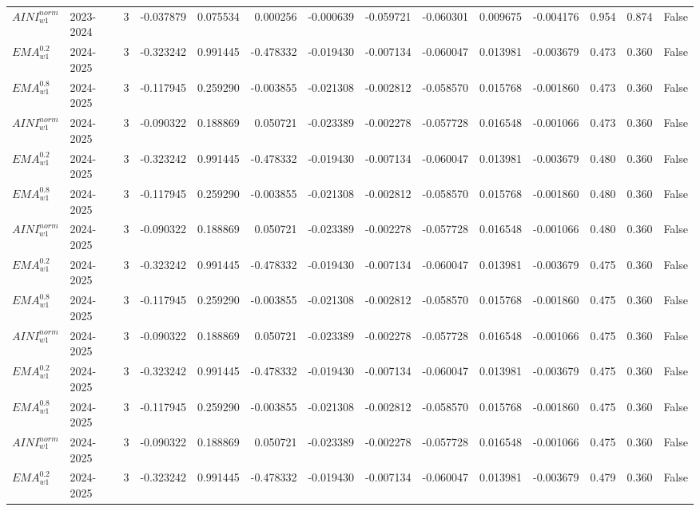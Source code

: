 \begin{tabular}{@{}llrrrrrrrrrlll@{}}
$AINI^{norm}_{w1}$ & 2023-2024 & 3 & -0.037879 & 0.075534 & 0.000256 & -0.000639 & -0.059721 & -0.060301 & 0.009675 & -0.004176 & 0.954 & 0.874 & False \\
$EMA^{0.2}_{w1}$ & 2024-2025 & 3 & -0.323242 & 0.991445 & -0.478332 & -0.019430 & -0.007134 & -0.060047 & 0.013981 & -0.003679 & 0.473 & 0.360 & False \\
$EMA^{0.8}_{w1}$ & 2024-2025 & 3 & -0.117945 & 0.259290 & -0.003855 & -0.021308 & -0.002812 & -0.058570 & 0.015768 & -0.001860 & 0.473 & 0.360 & False \\
$AINI^{norm}_{w1}$ & 2024-2025 & 3 & -0.090322 & 0.188869 & 0.050721 & -0.023389 & -0.002278 & -0.057728 & 0.016548 & -0.001066 & 0.473 & 0.360 & False \\
$EMA^{0.2}_{w1}$ & 2024-2025 & 3 & -0.323242 & 0.991445 & -0.478332 & -0.019430 & -0.007134 & -0.060047 & 0.013981 & -0.003679 & 0.480 & 0.360 & False \\
$EMA^{0.8}_{w1}$ & 2024-2025 & 3 & -0.117945 & 0.259290 & -0.003855 & -0.021308 & -0.002812 & -0.058570 & 0.015768 & -0.001860 & 0.480 & 0.360 & False \\
$AINI^{norm}_{w1}$ & 2024-2025 & 3 & -0.090322 & 0.188869 & 0.050721 & -0.023389 & -0.002278 & -0.057728 & 0.016548 & -0.001066 & 0.480 & 0.360 & False \\
$EMA^{0.2}_{w1}$ & 2024-2025 & 3 & -0.323242 & 0.991445 & -0.478332 & -0.019430 & -0.007134 & -0.060047 & 0.013981 & -0.003679 & 0.475 & 0.360 & False \\
$EMA^{0.8}_{w1}$ & 2024-2025 & 3 & -0.117945 & 0.259290 & -0.003855 & -0.021308 & -0.002812 & -0.058570 & 0.015768 & -0.001860 & 0.475 & 0.360 & False \\
$AINI^{norm}_{w1}$ & 2024-2025 & 3 & -0.090322 & 0.188869 & 0.050721 & -0.023389 & -0.002278 & -0.057728 & 0.016548 & -0.001066 & 0.475 & 0.360 & False \\
$EMA^{0.2}_{w1}$ & 2024-2025 & 3 & -0.323242 & 0.991445 & -0.478332 & -0.019430 & -0.007134 & -0.060047 & 0.013981 & -0.003679 & 0.475 & 0.360 & False \\
$EMA^{0.8}_{w1}$ & 2024-2025 & 3 & -0.117945 & 0.259290 & -0.003855 & -0.021308 & -0.002812 & -0.058570 & 0.015768 & -0.001860 & 0.475 & 0.360 & False \\
$AINI^{norm}_{w1}$ & 2024-2025 & 3 & -0.090322 & 0.188869 & 0.050721 & -0.023389 & -0.002278 & -0.057728 & 0.016548 & -0.001066 & 0.475 & 0.360 & False \\
$EMA^{0.2}_{w1}$ & 2024-2025 & 3 & -0.323242 & 0.991445 & -0.478332 & -0.019430 & -0.007134 & -0.060047 & 0.013981 & -0.003679 & 0.479 & 0.360 & False \\

\end{tabular}
